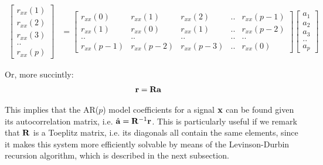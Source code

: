\documentclass[../main.tex]{subfiles}
\begin{document}
\begin{align*}
\left[ \begin{array}{c} r_{xx}(1) \\ r_{xx}(2) \\ r_{xx}(3) \\ .. \\ r_{xx}(p)  \end{array} \right] &= \begin{bmatrix} r_{xx}(0) & r_{xx}(1) & r_{xx}(2) & .. & r_{xx}(p-1) \\ r_{xx}(1) & r_{xx}(0) & r_{xx}(1) & .. & r_{xx}(p-2) \\ .. & .. & .. & ..  & .. \\ r_{xx}(p-1) & r_{xx}(p-2) & r_{xx}(p-3) & .. & r_{xx}(0) \end{bmatrix} \left[ \begin{array}{c} a_1 \\ a_2 \\ a_3 \\ .. \\ a_p \end{array} \right]
\end{align*}
\par Or, more succintly:
\begin{align*}
\mathbf{r} &= \mathbf{Ra}
\end{align*}
\par This implies that the AR($p$) model coefficients for a signal $\mathbf{x}$ can be found given its autocorrelation matrix, i.e. $\hat{\mathbf{a}} = \mathbf{R}^{-1}\mathbf{r}$. This is particularly useful if we remark that $\mathbf{R}$ is a Toeplitz matrix, i.e. its diagonals all contain the same elements, since it makes this system more efficiently solvable by means of the Levinson-Durbin recursion algorithm, which is described in the next subsection.
\end{document}
